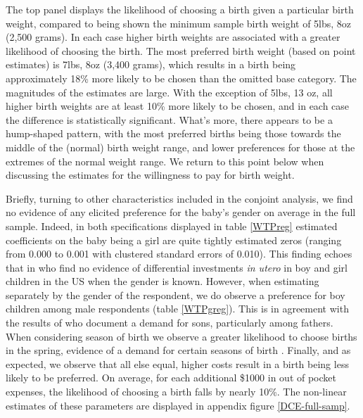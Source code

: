 \documentclass[a4paper, 11pt]{article}
\begin{document}
\begin{spacing}{1.4}
The top panel displays the likelihood of choosing a birth given a
particular birth weight, compared to being shown the minimum sample
birth weight of 5lbs, 8oz (2,500 grams).  In each case higher birth
weights are associated with a greater likelihood of choosing the
birth.  The most preferred birth weight (based on point estimates) is
7lbs, 8oz (3,400 grams), which results in a birth being approximately
18\% more likely to be chosen than the omitted base category.  The
magnitudes of the estimates are large.  With the exception of 5lbs, 13
oz, all higher birth weights are at least 10\% more likely to be chosen,
and in each case the difference is statistically significant.  What's
more, there appears to be a hump-shaped pattern, with the most
preferred births being those towards the middle of the (normal) birth
weight range, and lower preferences for those at the extremes of the
normal weight range.  We return to this point below when discussing
the estimates for the willingness to pay for birth weight.

Briefly, turning to other characteristics included in the conjoint analysis,
we find no evidence of any elicited preference for the baby's gender
on average in the full sample.  Indeed, in both specifications displayed
in table \ref{WTPreg} estimated coefficients on the baby being a girl are
quite tightly estimated zeros (ranging from 0.000 to 0.001 with clustered
standard errors of 0.010). This finding echoes that in \citet{LhilaSimon2008}
who find no evidence of differential investments \emph{in utero} in boy and
girl children in the US when the gender is known.  However, when estimating
separately by the gender of the respondent, we do observe a preference for
boy children among male respondents (table \ref{WTPgreg}). This is in
agreement with the results of \citet{DahlMoretti2008} who document a demand
for sons, particularly among fathers.  When considering season of birth
we observe a greater likelihood to choose births in the spring, evidence
of a demand for certain seasons of birth \citep{Clarkeetal2016}. Finally,
and as expected, we observe that all else equal, higher costs result in
a birth being less likely to be preferred.  On average, for each additional
\$1000 in out of pocket expenses, the likelihood of choosing a birth falls by
nearly 10\%.  The non-linear estimates of these parameters are displayed
in appendix figure \ref{DCE-full-samp}.


\end{spacing}
\end{document}
